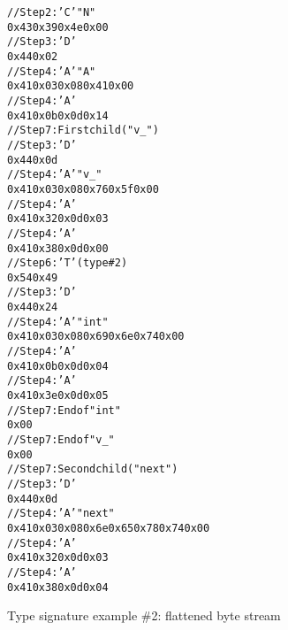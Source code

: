 \begin{figure}
\begin{dwflisting}
\begin{alltt}
// Step 2: 'C' \DWTAGnamespace "N"
0x43 0x39 0x4e 0x00
// Step 3: 'D' \DWTAGclasstype
0x44 0x02
// Step 4: 'A' \DWATname \DWFORMstring "A"
0x41 0x03 0x08 0x41 0x00
// Step 4: 'A' \DWATbytesize {}
0x41 0x0b 0x0d 0x14
// Step 7: First child ("v\_")
    // Step 3: 'D' \DWTAGmember
    0x44 0x0d
    // Step 4: 'A' \DWATname \DWFORMstring "v\_"
    0x41 0x03 0x08 0x76 0x5f 0x00
    // Step 4: 'A' \DWATaccessibility \DWFORMsdata \DWACCESSprivate
    0x41 0x32 0x0d 0x03
    // Step 4: 'A' \DWATdatamemberlocation {}
    0x41 0x38 0x0d 0x00
    // Step 6: 'T' \DWATtype (type \#2)
    0x54 0x49
        // Step 3: 'D' \DWTAGbasetype
        0x44 0x24
        // Step 4: 'A' \DWATname \DWFORMstring "int"
        0x41 0x03 0x08 0x69 0x6e 0x74 0x00
        // Step 4: 'A' \DWATbytesize {}
        0x41 0x0b 0x0d 0x04
        // Step 4: 'A' \DWATencoding \DWFORMsdata \DWATEsigned
        0x41 0x3e 0x0d 0x05
        // Step 7: End of \DWTAGbasetype "int"
        0x00
    // Step 7: End of \DWTAGmember "v\_"
    0x00
// Step 7: Second child ("next")
    // Step 3: 'D' \DWTAGmember
    0x44 0x0d
    // Step 4: 'A' \DWATname \DWFORMstring "next"
    0x41 0x03 0x08 0x6e 0x65 0x78 0x74 0x00
    // Step 4: 'A' \DWATaccessibility \DWFORMsdata \DWACCESSprivate
    0x41 0x32 0x0d 0x03
    // Step 4: 'A' \DWATdatamemberlocation {}
    0x41 0x38 0x0d 0x04
\end{alltt}
\end{dwflisting}
\caption{Type signature example \#2: flattened byte stream}
\label{fig:typesignatureexample2flattenedbytestream}
\end{figure}

